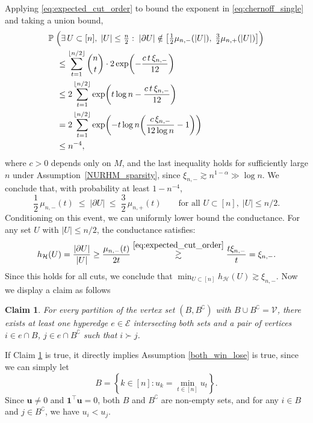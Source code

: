 \documentclass[
  12pt]{article}
\newtheorem{claim}[axiom]{Claim}
\begin{document}
Applying \eqref{eq:expected_cut_order} to bound the exponent in \eqref{eq:chernoff_single} and taking a union bound,
\begin{align}
&\mathbb{P}\;\Bigl(\exists\, U \subset [n],\;|U|\leq \tfrac{n}{2}:\;|\partial U| \notin \bigl[\tfrac{1}{2}\mu_{n,-}(|U|),\;\tfrac{3}{2}\mu_{n,+}(|U|)\bigr]\Bigr) \nonumber\\
&\quad\leq \sum_{t=1}^{\lfloor n/2\rfloor}\binom{n}{t}\cdot 2\exp\!\left(-\frac{c\,t\,\xi_{n,-}}{12}\right) \nonumber\\
&\quad\leq 2\sum_{t=1}^{\lfloor n/2\rfloor}\exp\!\left(t\log n - \frac{c\,t\,\xi_{n,-}}{12}\right) \nonumber\\
&\quad= 2\sum_{t=1}^{\lfloor n/2\rfloor}\exp\!\left(-t\log n\!\left(\frac{c\,\xi_{n,-}}{12\log n}-1\right)\right) \nonumber\\
&\quad\leq n^{-4}, \label{eq:concentration_result}
\end{align}
where $c > 0$ depends only on $M$, and the last inequality holds for sufficiently large $n$ under Assumption~\ref{NURHM_sparsity}, since $\xi_{n,-}\gtrsim n^{1-\alpha}\gg\log n$. We conclude that, with probability at least $1-n^{-4}$,
\begin{equation*}
\frac{1}{2}\,\mu_{n,-}(t) \;\leq\; |\partial U| \;\leq\; \frac{3}{2}\,\mu_{n,+}(t) \qquad\text{for all } U\subset[n],\;|U|\leq n/2.
\end{equation*}
Conditioning on this event, we can uniformly lower bound the conductance. For any set $U$ with $|U| \leq n/2$, the conductance satisfies:
\begin{equation}\label{eq:conductance_final}
h_{\mathcal{H}}(U) = \frac{|\partial U|}{|U|} \geq \frac{\mu_{n,-}(t)}{2t} \stackrel{\eqref{eq:expected_cut_order}}{\gtrsim} \frac{t \xi_{n,-}}{t} = \xi_{n,-}.
\end{equation}
Since this holds for all cuts, we conclude that $\min_{U \subset[n]} h_{\mathcal{H}}(U) \gtrsim \xi_{n,-}$. Now we display a claim as follows 
\begin{claim}\label{claim:partition}
For every partition of the vertex set $(B, B^\complement)$ with $B \cup B^\complement = \mathcal{V}$, there exists at least one hyperedge $e \in \mathcal{E}$ intersecting both sets and a pair of vertices $i \in e \cap B$, $j \in e \cap B^\complement$ such that $i \succ j$.
\end{claim}

If Claim \ref{claim:partition} is true, it directly implies Assumption \ref{both_win_lose} is true, since we can simply let 
$$B= \left\{k \in[n]: u_k=\min _{t \in[n]} u_t\right\}.$$
\noindent Since $\boldsymbol{u} \neq 0$ and $\mathbf{1}^{\top} \boldsymbol{u}=0$, both $B$ and $B^\complement$ are non-empty sets, and for any $i \in B$ and $j \in B^\complement$, we have $u_{i}<u_{j}$. 
\end{document}
